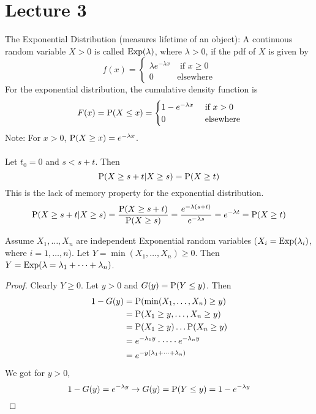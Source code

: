\documentclass[12pt]{article}
\begin{document}
\section{Lecture 3}

The Exponential Distribution (measures lifetime of an object): A continuous random variable $X > 0$ is called $\text{Exp}( \lambda )$, where $\lambda > 0$, if the pdf of $X$ is given by 
$$f(x) = \begin{cases} \lambda e^{-\lambda x} &\text{ if } x \geq 0 \\ 0 &\text{elsewhere} \end{cases} $$ 
For the exponential distribution, the cumulative density function is 
$$F(x) = \mathrm{P}( X \leq x ) = \begin{cases} 1 - e^{-\lambda x} &\text{ if } x > 0 \\ 0 &\text{ elsewhere} \end{cases} $$ 
Note: For $x > 0$, $\mathrm{P}( X \geq x ) = e^{-\lambda x}$. \\~\\
Let $t_0 = 0$ and $s < s + t$. Then $$ \mathrm{P}( X \geq s + t | X \geq s ) = \mathrm{P}( X \geq t ) $$ 
This is the lack of memory property for the exponential distribution. 
$$ \mathrm{P}( X \geq s + t | X \geq s ) = \frac{\mathrm{P}( X \geq s + t )}{\mathrm{P}( X \geq s )} = \frac{e^{-\lambda(s + t)}}{e^{-\lambda s}} = e^{-\lambda t} = \mathrm{P}( X \geq t ) $$ 
\begin{theorem} Assume $X_1, \dots, X_n$ are independent Exponential random variables ($X_i = \text{Exp}( \lambda_i )$, where $i = 1,\dots, n$). Let $Y = \min(X_1, \dots, X_n) \geq 0$. Then $Y = \text{Exp}( \lambda = \lambda_1 + \dots + \lambda_n )$. \end{theorem} 
\begin{proof} Clearly $Y \geq 0$. Let $y > 0$ and $G(y) = \mathrm{P}( Y \leq y )$. Then $$ \begin{aligned} 
1 - G(y) &= \mathrm{P}( \min(X_1,\dots,X_n) \geq y ) \\ &= \mathrm{P}( X_1 \geq y, \dots, X_n \geq y ) \\ &= \mathrm{P}( X_1 \geq y )\dots\mathrm{P}( X_n \geq y ) \\ &= e^{-\lambda_1 y}\cdot \dots \cdot e^{-\lambda_n y} \\ &= e^{-y(\lambda_1 + \dots + \lambda_n)} \end{aligned} $$ We got for $y > 0$, $$ 1 - G(y) = e^{-\lambda y} \to G(y) = \mathrm{P}( Y \leq y ) = 1 - e^{-\lambda y} $$ \end{proof} 
\end{document}
